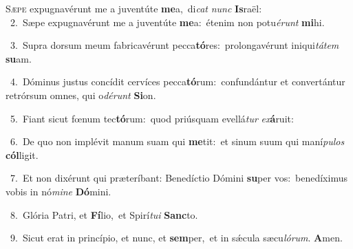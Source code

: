 \lettrine{\initial\textcolor{\initialcolor}{S}}{æpe} expugnavérunt me a juventúte \textbf{me}\-a,~\star di\textit{cat} \textit{nunc} \textbf{Is}\-raël:\\
{\numbfont\textcolor{\numbcolor}{~2.}}~Sæpe expugnavérunt me a juventúte \textbf{me}\-a:~\star étenim non potu\-\textit{é}\-\textit{runt} \textbf{mi}\-hi.\par
{\numbfont\textcolor{\numbcolor}{~3.}}~Supra dorsum meum fabricavérunt pecca\-\textbf{tó}\-res:~\star prolongavérunt iniqui\-\textit{tá}\-\textit{tem} \textbf{su}\-am.\par
{\numbfont\textcolor{\numbcolor}{~4.}}~Dóminus justus concídit cervíces pecca\-\textbf{tó}\-rum:~\star confundántur et convertántur retrórsum omnes, qui o\-\textit{dé}\-\textit{runt} \textbf{Si}\-on.\par
{\numbfont\textcolor{\numbcolor}{~5.}}~Fiant sicut fœnum tec\-\textbf{tó}\-rum:~\star quod priúsquam evellá\textit{tur} \textit{ex}\-\textbf{á}ruit:\par
{\numbfont\textcolor{\numbcolor}{~6.}}~De quo non implévit manum suam qui \textbf{me}\-tit:~\star et sinum suum qui maní\-\textit{pu}\-\textit{los} \textbf{cól}\-ligit.\par
{\numbfont\textcolor{\numbcolor}{~7.}}~Et non dixérunt qui præteríbant: Benedíctio Dómini \textbf{su}\-per vos:~\star benedíximus vobis in nó\-\textit{mi}\-\textit{ne} \textbf{Dó}\-mini.\par
{\numbfont\textcolor{\numbcolor}{~8.}}~Glória Patri, et \textbf{Fí}\-lio,~\star et Spirí\-\textit{tu}\-\textit{i} \textbf{Sanc}\-to.\par
{\numbfont\textcolor{\numbcolor}{~9.}}~Sicut erat in princípio, et nunc, et \textbf{sem}\-per,~\star et in sǽcula sæcu\-\textit{ló}\-\textit{rum}. \textbf{A}\-men.\par
